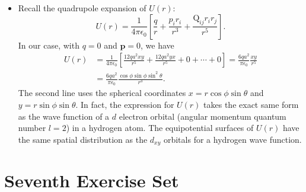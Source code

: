 \documentclass[11pt, a4paper]{article}
\renewcommand{\vec}[1]{\bm{#1}} %
\newcommand{\ee}{\epsilon_{0}}  %
\begin{document}
\begin{itemize}
	\item Recall the quadrupole expansion of $ U(r) $:
	\begin{equation*}
		U(r) = \frac{1}{4\pi \ee} \left[\frac{q}{r} + \frac{p_{i}r_{i}}{r^{3}} + \frac{\mathrm{Q}_{ij}r_{i}r_{j}}{r^{5}} \right].
	\end{equation*}
	In our case, with $ q = 0 $ and $ \vec{p} = 0 $, we have
	\begin{align*}
		U(r) &= \frac{1}{4\pi \ee} \left[\frac{12qa^{2}xy}{r^{5}} + \frac{12qa^{2}yx}{r^{5}} + 0 + \cdots + 0\right] = \frac{6qa^{2}}{\pi \ee} \frac{xy}{r^{5}}\\
		&=\frac{6qa^{2}}{\pi \ee} \frac{\cos \phi \sin \phi \sin^{2}\theta}{r^{3}}.
	\end{align*}
	The second line uses the spherical coordinates $ x = r\cos \phi \sin \theta $ and $ y = r\sin \phi \sin \theta $. In fact, the expression for $ U(r) $ takes the exact same form as the wave function of a $ d $ electron orbital (angular momentum quantum number $ l = 2 $) in a hydrogen atom. The equipotential surfaces of $ U(r) $ have the same spatial distribution as the $ d_{xy} $  orbitals for a hydrogen wave function. 
	
\end{itemize}


\newpage
\section{Seventh Exercise Set}
\end{document}
